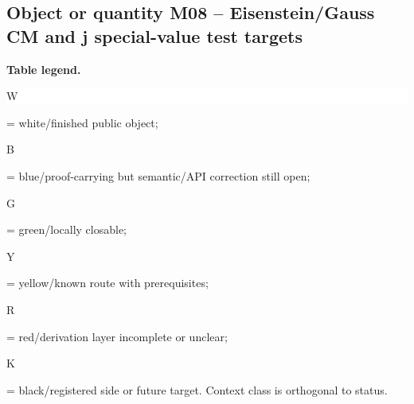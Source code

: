 \subsection*{Object or quantity M08 -- Eisenstein/\allowbreak{}Gauss CM and j special-value test targets}
\hypertarget{objproof:M08}{}
\par\smallskip\noindent\begin{minipage}{0.99\linewidth}\footnotesize\raggedright\textbf{Table legend.} \colorbox{white}{\strut W} = white/finished public object; \colorbox{cyan!20}{\strut B} = blue/proof-carrying but semantic/API correction still open; \colorbox{green!18}{\strut G} = green/locally closable; \colorbox{yellow!25}{\strut Y} = yellow/known route with prerequisites; \colorbox{red!20}{\strut R} = red/derivation layer incomplete or unclear; \colorbox{black!18}{\strut K} = black/registered side or future target. Context class is orthogonal to status.\end{minipage}\par\vspace{0.25em}
